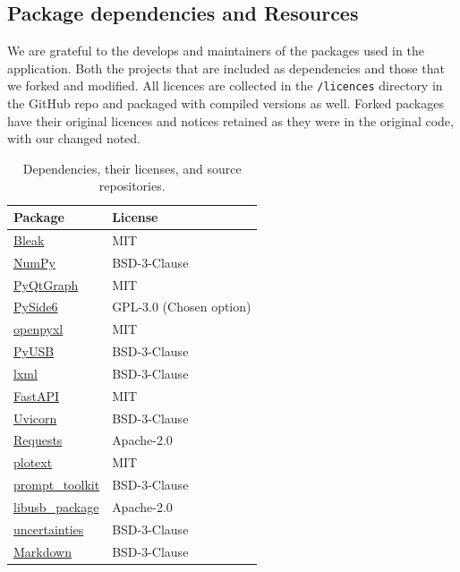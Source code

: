 \subsection{Package dependencies and Resources}
We are grateful to the develops and maintainers of the packages used in the application. Both the projects that are included as dependencies and those that we forked and modified. All licences are collected in the \texttt{/licences} directory in the GitHub repo and packaged with compiled versions as well. Forked packages have their original licences and notices retained as they were in the original code, with our changed noted.

\begin{table}[H]
    \centering
    \caption{Dependencies, their licenses, and source repositories.}
    \label{tab:dependencies}
    \begin{tabular}{ll}
        \toprule
        \textbf{Package} & \textbf{License} \\
        \midrule
        \href{https://github.com/hbldh/bleak}{Bleak} & MIT \\
        \href{https://github.com/numpy/numpy}{NumPy} & BSD-3-Clause \\
        \href{https://github.com/pyqtgraph/pyqtgraph}{PyQtGraph} & MIT \\
        \href{https://github.com/pyside/pyside-setup}{PySide6} & GPL-3.0 (Chosen option) \\
        \href{https://foss.heptapod.net/openpyxl/openpyxl}{openpyxl} & MIT \\
        \href{https://github.com/pyusb/pyusb}{PyUSB} & BSD-3-Clause \\
        \href{https://github.com/lxml/lxml}{lxml} & BSD-3-Clause \\
        \href{https://github.com/fastapi/fastapi}{FastAPI} & MIT \\
        \href{https://github.com/encode/uvicorn}{Uvicorn} & BSD-3-Clause \\
        \href{https://github.com/psf/requests}{Requests} & Apache-2.0 \\
        \href{https://github.com/piccolomo/plotext}{plotext} & MIT \\
        \href{https://github.com/prompt-toolkit/python-prompt-toolkit}{prompt\_toolkit} & BSD-3-Clause \\
        \href{https://github.com/pyocd/libusb-package}{libusb\_package} & Apache-2.0 \\
        \href{https://github.com/lmfit/uncertainties}{uncertainties} & BSD-3-Clause \\
        \href{https://github.com/Python-Markdown/markdown}{Markdown} & BSD-3-Clause \\
        \bottomrule
    \end{tabular}
\end{table}

